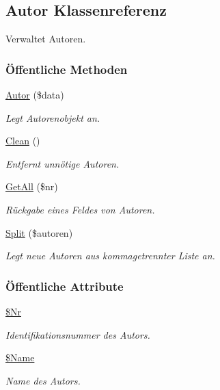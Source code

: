 \hypertarget{classAutor}{
\subsection{Autor Klassenreferenz}
\label{classAutor}
}
Verwaltet Autoren.  


\subsubsection*{\"{O}ffentliche Methoden}
\begin{CompactItemize}
\item 
\hyperlink{classAutor_2302710dd8970853f5d49c62d4586e8f}{Autor} (\$data)
\begin{CompactList}\small\item\em Legt Autorenobjekt an. \item\end{CompactList}\item 
\hyperlink{classAutor_77b27af7e471abe5a404fc92c7319921}{Clean} ()
\begin{CompactList}\small\item\em Entfernt unnötige Autoren. \item\end{CompactList}\item 
\hyperlink{classAutor_073e31faa28a51d6992e6bed20326a07}{Get\-All} (\$nr)
\begin{CompactList}\small\item\em Rückgabe eines Feldes von Autoren. \item\end{CompactList}\item 
\hyperlink{classAutor_2ba5418b6622f414fa8a054e6c2a2db8}{Split} (\$autoren)
\begin{CompactList}\small\item\em Legt neue Autoren aus kommagetrennter Liste an. \item\end{CompactList}\end{CompactItemize}
\subsubsection*{\"{O}ffentliche Attribute}
\begin{CompactItemize}
\item 
\hyperlink{classAutor_23e64634d5dc31b41b7ee9c49b9ea6b9}{\$Nr}
\begin{CompactList}\small\item\em Identifikationsnummer des Autors. \item\end{CompactList}\item 
\hyperlink{classAutor_8602b5705cef83e7c16f4040f9add56d}{\$Name}
\begin{CompactList}\small\item\em Name des Autors. \item\end{CompactList}\end{CompactItemize}


